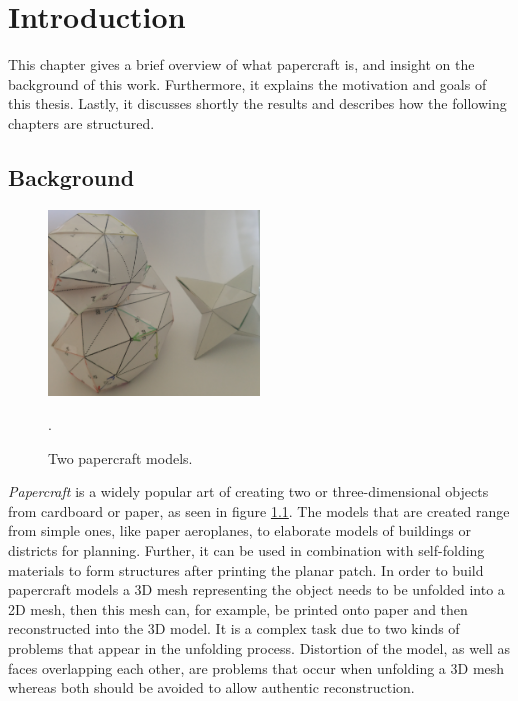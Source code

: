 \documentclass[draft,final]{vutinfth} %
\begin{document}

\tableofcontents %

\mainmatter

\chapter{Introduction}
This chapter gives a brief overview of what papercraft is, and insight on the background of this work. Furthermore, it explains the motivation and goals of this thesis. Lastly, it discusses shortly the results and describes how the following chapters are structured.

\section{Background}

\begin{figure}
    \centering
    \includegraphics[width=0.5\textwidth]{"graphics/papercraft"}
    \caption{Two papercraft models.}
    \label{fig:papercraft}.
\end{figure}

\textit{Papercraft} is a widely popular art of creating two or three-dimensional objects from cardboard or paper, as seen in figure \ref{fig:papercraft}. The models that are created range from simple ones, like paper aeroplanes, to elaborate models of buildings or districts for planning. Further, it can be used in combination with self-folding materials to form structures after printing the planar patch. In order to build papercraft models a 3D mesh representing the object needs to be unfolded into a 2D mesh, then this mesh can, for example, be printed onto paper and then reconstructed into the 3D model. It is a complex task due to two kinds of problems that appear in the unfolding process. Distortion of the model, as well as faces overlapping each other, are problems that occur when unfolding a 3D mesh whereas both should be avoided to allow authentic reconstruction.
\end{document}
